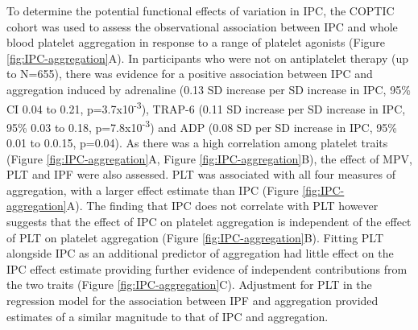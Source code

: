 \documentclass[11pt,twoside]{bristolthesis}
\begin{document}
To determine the potential functional effects of variation in IPC, the COPTIC cohort was used to assess the observational association between IPC and whole blood platelet aggregation in response to a range of platelet agonists (Figure \ref{fig:IPC-aggregation}A). In participants who were not on antiplatelet therapy (up to N=655), there was evidence for a positive association between IPC and aggregation induced by adrenaline (0.13 SD increase per SD increase in IPC, 95\% CI 0.04 to 0.21, p=3.7x10\textsuperscript{-3}), TRAP-6 (0.11 SD increase per SD increase in IPC, 95\% 0.03 to 0.18, p=7.8x10\textsuperscript{-3}) and ADP (0.08 SD per SD increase in IPC, 95\% 0.01 to 0.0.15, p=0.04). As there was a high correlation among platelet traits (Figure \ref{fig:IPC-aggregation}A, Figure \ref{fig:IPC-aggregation}B), the effect of MPV, PLT and IPF were also assessed. PLT was associated with all four measures of aggregation, with a larger effect estimate than IPC (Figure \ref{fig:IPC-aggregation}A). The finding that IPC does not correlate with PLT however suggests that the effect of IPC on platelet aggregation is independent of the effect of PLT on platelet aggregation (Figure \ref{fig:IPC-aggregation}B). Fitting PLT alongside IPC as an additional predictor of aggregation had little effect on the IPC effect estimate providing further evidence of independent contributions from the two traits (Figure \ref{fig:IPC-aggregation}C). Adjustment for PLT in the regression model for the association between IPF and aggregation provided estimates of a similar magnitude to that of IPC and aggregation.
\end{document}

